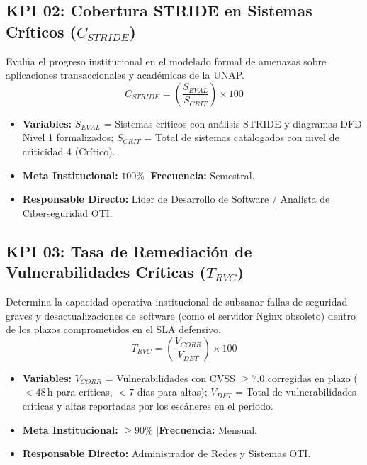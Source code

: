 \subsection{KPI 02: Cobertura STRIDE en Sistemas Críticos \texorpdfstring{($C_{STRIDE}$)}{(C\_STRIDE)}}
Evalúa el progreso institucional en el modelado formal de amenazas sobre aplicaciones transaccionales y académicas de la UNAP.
\[
C_{STRIDE} = \left( \frac{S_{EVAL}}{S_{CRIT}} \right) \times 100
\]
\begin{itemize}[leftmargin=1.5em, itemsep=1pt]
    \item \textbf{Variables:} $S_{EVAL}$ = Sistemas críticos con análisis STRIDE y diagramas DFD Nivel 1 formalizados; $S_{CRIT}$ = Total de sistemas catalogados con nivel de criticidad 4 (Crítico).
    \item \textbf{Meta Institucional:} $100\%$ \quad$\vert$\quad \textbf{Frecuencia:} Semestral.
    \item \textbf{Responsable Directo:} Líder de Desarrollo de Software / Analista de Ciberseguridad OTI.
\end{itemize}

\subsection{KPI 03: Tasa de Remediación de Vulnerabilidades Críticas \texorpdfstring{($T_{RVC}$)}{(T\_RVC)}}
Determina la capacidad operativa institucional de subsanar fallas de seguridad graves y desactualizaciones de software (como el servidor Nginx obsoleto) dentro de los plazos comprometidos en el SLA defensivo.
\[
T_{RVC} = \left( \frac{V_{CORR}}{V_{DET}} \right) \times 100
\]
\begin{itemize}[leftmargin=1.5em, itemsep=1pt]
    \item \textbf{Variables:} $V_{CORR}$ = Vulnerabilidades con CVSS $\ge 7.0$ corregidas en plazo ($<48$\,h para críticas, $<7$ días para altas); $V_{DET}$ = Total de vulnerabilidades críticas y altas reportadas por los escáneres en el periodo.
    \item \textbf{Meta Institucional:} $\ge 90\%$ \quad$\vert$\quad \textbf{Frecuencia:} Mensual.
    \item \textbf{Responsable Directo:} Administrador de Redes y Sistemas OTI.
\end{itemize}

